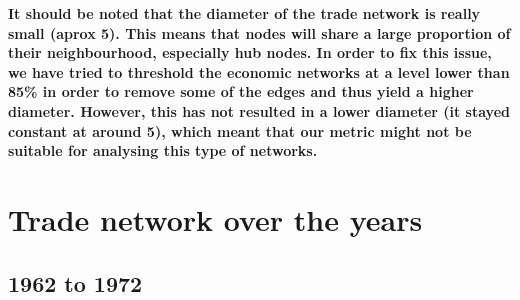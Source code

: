 \documentclass[11pt,a4paper,oneside]{report}
\begin{document}
\textbf{It should be noted that the diameter of the trade network is really small (aprox 5). This means that nodes will share a large proportion of their neighbourhood, especially hub nodes. In order to fix this issue, we have tried to threshold the economic networks at a level lower than 85\% in order to remove some of the edges and thus yield a higher diameter. However, this has not resulted in a lower diameter (it stayed constant at around 5), which meant that our metric might not be suitable for analysing this type of networks.}

\section*{Trade network over the years}

\subsection*{1962 to 1972}
\end{document}
